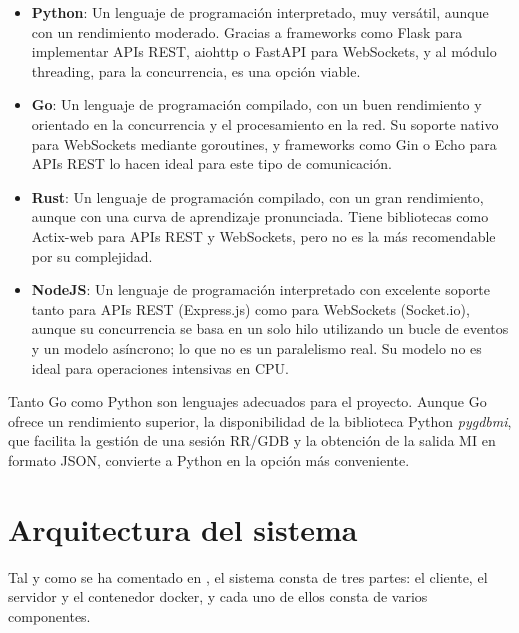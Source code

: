 \begin{itemize}
    \item \textbf{Python}: Un lenguaje de programación interpretado, muy versátil, aunque con un rendimiento moderado. Gracias a frameworks como Flask para implementar APIs REST, aiohttp o FastAPI para WebSockets, y al módulo threading, para la concurrencia, es una opción viable.
    \item \textbf{Go}: Un lenguaje de programación compilado, con un buen rendimiento y orientado en la concurrencia y el procesamiento en la red. Su soporte nativo para WebSockets mediante goroutines, y frameworks como Gin o Echo para APIs REST lo hacen ideal para este tipo de comunicación.
    \item \textbf{Rust}: Un lenguaje de programación compilado, con un gran rendimiento, aunque con una curva de aprendizaje pronunciada. Tiene bibliotecas como Actix-web para APIs REST y WebSockets, pero no es la más recomendable por su complejidad. 
    \item \textbf{NodeJS}: Un lenguaje de programación interpretado con excelente soporte tanto para APIs REST (Express.js) como para WebSockets (Socket.io), aunque su concurrencia se basa en un solo hilo utilizando un bucle de eventos y un modelo asíncrono; lo que no es un paralelismo real. Su modelo no es ideal para operaciones intensivas en CPU.
\end{itemize}

Tanto Go como Python son lenguajes adecuados para el proyecto. Aunque Go ofrece un rendimiento superior, la disponibilidad de la biblioteca Python \textit{pygdbmi}, que facilita la gestión de una sesión RR/GDB y la obtención de la salida MI en formato JSON, convierte a Python en la opción más conveniente.

\section{Arquitectura del sistema}\label{sec:arquitectura-sistema}

Tal y como se ha comentado en , el sistema consta de tres partes: el cliente, el servidor y el contenedor docker, y cada uno de ellos consta de varios componentes. 


